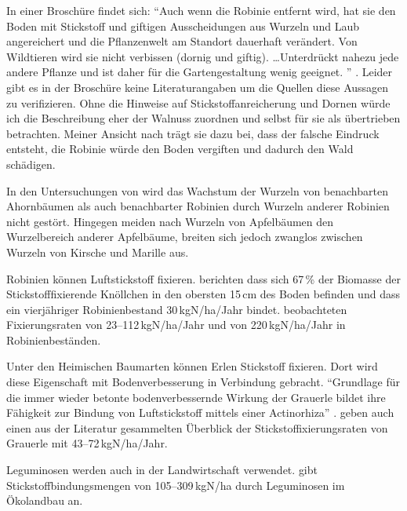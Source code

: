 \documentclass[twocolumn]{scrartcl}
\begin{document}
In einer Broschüre findet sich: \enquote{Auch wenn die Robinie entfernt wird,
hat sie den Boden mit Stickstoff und giftigen Ausscheidungen aus Wurzeln und
Laub angereichert und die Pflanzenwelt am Standort dauerhaft verändert. Von
Wildtieren wird sie nicht verbissen (dornig und giftig). \dots Unterdrückt
nahezu jede andere Pflanze und ist daher für die Gartengestaltung wenig
geeignet.%
} \citep{oebf2019aliensAusDemGarten}. Leider gibt es in der Broschüre
keine Literaturangaben um die Quellen diese Aussagen zu verifizieren.
Ohne die Hinweise auf Stickstoffanreicherung und Dornen würde ich die
Beschreibung eher der Walnuss zuordnen und selbst für sie als
übertrieben betrachten. Meiner Ansicht nach trägt sie dazu bei, dass
der falsche Eindruck entsteht, die Robinie würde den Boden vergiften
und dadurch den Wald schädigen.

In den Untersuchungen von
\citet[S.~150--160]{scamoni1952robinieWurzeln} wird das Wachstum der
Wurzeln von benachbarten Ahornbäumen als auch benachbarter Robinien
durch Wurzeln anderer Robinien nicht gestört. Hingegen meiden nach
\citet[S.~53]{kolesnikov1971wurzeln} Wurzeln von Apfelbäumen den
Wurzelbereich anderer Apfelbäume, breiten sich jedoch zwanglos
zwischen Wurzeln von Kirsche und Marille aus.

Robinien können Luftstickstoff fixieren.
\citet{boring1984robinieN} berichten dass sich 67\,\% der Biomasse der
Stickstofffixierende Knöllchen in den obersten 15\,cm des Boden befinden
und dass ein vierjähriger Robinienbestand 30\,kgN/ha/Jahr bindet.
\citet{noh2009robinieN} beobachteten
Fixierungsraten von 23--112\,kgN/ha/Jahr und \citet{danso1995robinieN}
von 220\,kgN/ha/Jahr in Robinienbeständen.

Unter den Heimischen Baumarten können Erlen Stickstoff fixieren. Dort
wird diese Eigenschaft mit Bodenverbesserung in Verbindung
gebracht. \enquote{Grundlage für die immer wieder betonte bodenverbessernde
Wirkung der Grauerle bildet ihre Fähigkeit zur Bindung von
Luftstickstoff mittels einer Actinorhiza}
\citep{schuett2014alnusIncarna}. \citet{schuett2014alnusIncarna} geben
auch einen aus der Literatur gesammelten Überblick der
Stickstoffixierungsraten von Grauerle mit 43--72\,kgN/ha/Jahr.

Leguminosen werden auch in der Landwirtschaft verwendet.
\citet{kolbe2008stickstoff} gibt Stickstoffbindungsmengen von
105--309\,kgN/ha durch Leguminosen im Ökolandbau an.
\end{document}
